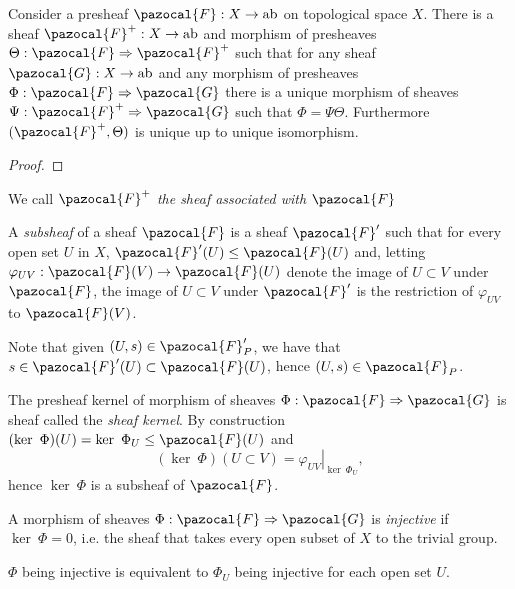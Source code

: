 \begin{lemma}
    Consider a presheaf $\pazocal{F}:X\rightarrow \mathrm{ab}$ on topological space $X$. There is a sheaf $\pazocal{F}^{+}: X\rightarrow \mathrm{ab}$ and morphism of presheaves $\Theta : \pazocal{F}\Rightarrow\pazocal{F}^{+}$ such that for any sheaf $\pazocal{G}:X\rightarrow \mathrm{ab}$ and any morphism of presheaves $\Phi : \pazocal{F} \Rightarrow \pazocal{G}$ there is a unique morphism of sheaves $\Psi : \pazocal{F}^{+}\Rightarrow \pazocal{G}$ such that $\Phi = \Psi \Theta$. Furthermore $(\pazocal{F}^{+},\Theta)$ is unique up to unique isomorphism. 
\end{lemma}
\begin{proof}
    
\end{proof}
\begin{remark}
    We call $\pazocal{F}^{+}$ \emph{the sheaf associated with $\pazocal{F}$}
\end{remark}
\begin{definition}
    A \emph{subsheaf} of a sheaf $\pazocal{F}$ is a sheaf $\pazocal{F}'$ such that for every open set $U$ in $X$, $\pazocal{F}'(U)\leq \pazocal{F}(U)$ and, letting $\varphi_{UV}:\pazocal{F}(V)\rightarrow \pazocal{F}(U)$ denote the image of $U\subset V$ under $\pazocal{F}$, the image of $U\subset V$ under $\pazocal{F}'$ is the restriction of $\varphi_{UV}$ to $\pazocal{F}(V)$.
\end{definition}
\begin{remark}
    Note that given $(U,s)\in \pazocal{F}'_P$, we have that $s\in \pazocal{F}'(U)\subset \pazocal{F}(U)$, hence $(U,s)\in \pazocal{F}_P$. 
\end{remark}
\begin{example}
    The presheaf kernel of morphism of sheaves $\Phi:\pazocal{F}\Rightarrow \pazocal{G}$ is sheaf called the \emph{sheaf kernel}. By construction $(\ker \ \Phi)(U) = \ker \ \Phi_U \leq \pazocal{F}(U)$ and 
    $$(\ker \ \Phi)(U\subset V) = \left. \varphi_{UV}\right|_{\ker\ \Phi_U},$$
    hence $\ker \ \Phi$ is a subsheaf of $\pazocal{F}$. 
\end{example}
\begin{definition}
    A morphism of sheaves $\Phi:\pazocal{F}\Rightarrow \pazocal{G}$ is \emph{injective} if $\ker \ \Phi=0$, i.e. the sheaf that takes every open subset of $X$ to the trivial group.
\end{definition}
\begin{remark}
    $\Phi$ being injective is equivalent to $\Phi_U$ being injective for each open set $U$. 
\end{remark}
